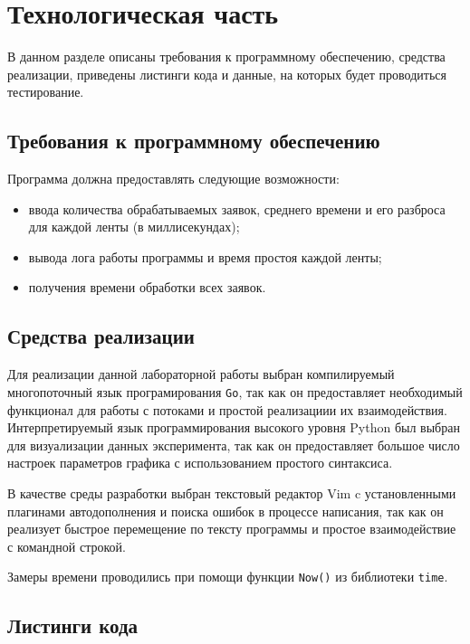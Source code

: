 \chapter{Технологическая часть}

В данном разделе описаны требования к программному обеспечению, средства
реализации, приведены листинги кода и данные, на которых будет проводиться
тестирование.

\section{Требования к программному обеспечению}

Программа должна предоставлять следующие возможности:
\begin{itemize}[left=\parindent]
    \item ввода количества обрабатываемых заявок, среднего времени и его
        разброса для каждой ленты (в миллисекундах);
    \item вывода лога работы программы и время простоя каждой ленты;
    \item получения времени обработки всех заявок.
\end{itemize}

\section{Средства реализации}

Для реализации данной лабораторной работы выбран компилируемый многопоточный
язык програмирования \texttt{Go}\cite{golang}, так как он предоставляет
необходимый функционал для работы с потоками и простой реализациии их
взаимодействия. Интерпретируемый язык программирования высокого уровня
Python\cite{python} был выбран для визуализации данных эксперимента, так как он
предоставляет большое число настроек параметров графика с использованием
простого синтаксиса. 

В качестве среды разработки выбран текстовый редактор Vim\cite{vim} c
установленными плагинами автодополнения и поиска ошибок в процессе написания,
так как он реализует быстрое перемещение по тексту программы и простое
взаимодействие с командной строкой.

Замеры времени проводились при помощи функции \texttt{Now()}
из библиотеки \texttt{time}\cite{time}.

\newpage
\section{Листинги кода}

